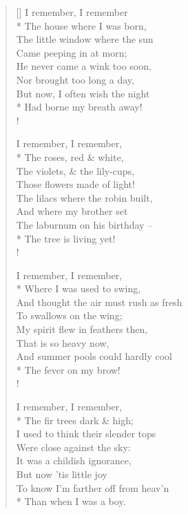 \documentclass[MAIN]{subfiles}
\begin{document}
\settowidth{\versewidth}{The window where the sun}
\begin{verse}[\versewidth]
I remember, I remember\\*
\vin The house where I was born,\\
The little window where the sun\\
\vin Came peeping in at morn;\\
He never came a wink too soon,\\
\vin Nor brought too long a day,\\
But now, I often wish the night\\*
\vin Had borne my breath away!\\!

I remember, I remember,\\*
\vin The roses, red \& white,\\
The violets, \& the lily-cups,\\
\vin Those flowers made of light!\\
The lilacs where the robin built,\\
\vin And where my brother set\\
The laburnum on his birthday --\\*
\vin The tree is living yet!\\!

I remember, I remember,\\*
\vin Where I was used to swing,\\
And thought the air must rush as fresh\\
\vin To swallows on the wing;\\
My spirit flew in feathers then,\\
\vin That is so heavy now,\\
And summer pools could hardly cool\\*
\vin The fever on my brow!\\!

I remember, I remember,\\*
\vin The fir trees dark \& high;\\
I used to think their slender tops\\
\vin Were close against the sky:\\
It was a childish ignorance,\\
\vin But now 'tis little joy\\
To know I'm farther off from heav'n\\*
\vin Than when I was a boy.
\end{verse}
\end{document}
